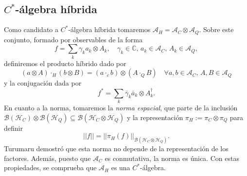 \documentclass[openany, 11pt]{book}
\numberwithin{equation}{chapter}
\newcommand{\Hc}{\mathcal H_C}
\newcommand{\Hq}{\mathcal H_Q}
\newcommand{\Ac}{\mathcal A_C}
\newcommand{\Aq}{\mathcal A_Q}
\newcommand{\Ah}{\mathcal A_H}
\begin{document}
\subsection{$C^*$-álgebra híbrida}

Como candidato a $C^*$-álgebra híbrida tomaremos $\Ah = \Ac\otimes\Aq$. Sobre este conjunto, formado por observables de la forma \begin{equation}f=\sum_k\gamma_k a_k\otimes A_k, \quad \gamma_k\in\mathbb C,\, a_k\in\Ac, \, A_k\in\Aq,\end{equation}definiremos el producto híbrido dado por \begin{equation}
    (a\otimes A) \cdot_H (b\otimes B)= (a\cdot_c b) \otimes (A\cdot_Q B) \quad \forall a,b\in\Ac, \, A,B\in\Aq
\end{equation}y la conjugación dada por \begin{equation}
    f^* = \sum_k \bar \gamma_k \bar a_k\otimes A_k^\dagger.
\end{equation}En cuanto a la norma, tomaremos la \textit{norma espacial}, que parte de la inclusión $\mathcal B(\Hc)\otimes \mathcal B(\Hq)\subseteq \mathcal B(\Hc\otimes\Hq)$ y la representación $\pi_H := \pi_C\otimes \pi_Q$ para definir \begin{equation}
    ||f|| = ||\pi_H(f)||_{\mathcal B(\Hc\otimes \Hq)}.
\end{equation}Turumaru\cite{turumaru} demostró que esta norma no depende de la representación de los factores. Además, puesto que $\Ac$ es conmutativa, la norma es única. Con estas propiedades, se comprueba que $\Ah$ es una $C^*$-álgebra.
\end{document}
